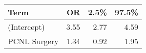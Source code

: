 \begin{table}[ht]
\centering
\begin{tabular}{lrrr}
  \toprule
{\textbf{Term}} & {\textbf{OR}} & {\textbf{2.5\%}} & {\textbf{97.5\%}} \\ 
  \midrule
(Intercept) & 3.55 & 2.77 & 4.59 \\ 
  PCNL Surgery & 1.34 & 0.92 & 1.95 \\ 
   \bottomrule
\end{tabular}
\end{table}
